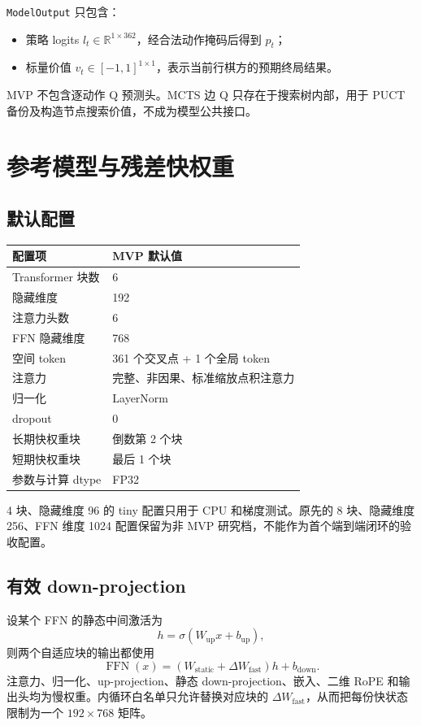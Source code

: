 \documentclass[UTF8,11pt,a4paper]{ctexart}
\newcommand{\code}[1]{\texttt{#1}}
\begin{document}
\code{ModelOutput} 只包含：

\begin{itemize}
  \item 策略 logits $l_t\in\mathbb{R}^{1\times362}$，经合法动作掩码后得到 $p_t$；
  \item 标量价值 $v_t\in[-1,1]^{1\times1}$，表示当前行棋方的预期终局结果。
\end{itemize}

MVP 不包含逐动作 Q 预测头。MCTS 边 Q 只存在于搜索树内部，用于 PUCT 备份及构造节点搜索价值，不成为模型公共接口。

\section{参考模型与残差快权重}

\subsection{默认配置}

\begin{center}
\begin{tabular}{ll}
\toprule
配置项 & MVP 默认值 \\
\midrule
Transformer 块数 & 6 \\
隐藏维度 & 192 \\
注意力头数 & 6 \\
FFN 隐藏维度 & 768 \\
空间 token & 361 个交叉点 + 1 个全局 token \\
注意力 & 完整、非因果、标准缩放点积注意力 \\
归一化 & LayerNorm \\
dropout & 0 \\
长期快权重块 & 倒数第 2 个块 \\
短期快权重块 & 最后 1 个块 \\
参数与计算 dtype & FP32 \\
\bottomrule
\end{tabular}
\end{center}

4 块、隐藏维度 96 的 tiny 配置只用于 CPU 和梯度测试。原先的 8 块、隐藏维度 256、FFN 维度 1024 配置保留为非 MVP 研究档，不能作为首个端到端闭环的验收配置。

\subsection{有效 down-projection}

设某个 FFN 的静态中间激活为
\[
  h=\sigma(W_{\mathrm{up}}x+b_{\mathrm{up}}),
\]
则两个自适应块的输出都使用
\[
  \operatorname{FFN}(x)
  =\left(W_{\mathrm{static}}+\Delta W_{\mathrm{fast}}\right)h+b_{\mathrm{down}}.
\]
注意力、归一化、up-projection、静态 down-projection、嵌入、二维 RoPE 和输出头均为慢权重。内循环白名单只允许替换对应块的 $\Delta W_{\mathrm{fast}}$，从而把每份快状态限制为一个 $192\times768$ 矩阵。
\end{document}
